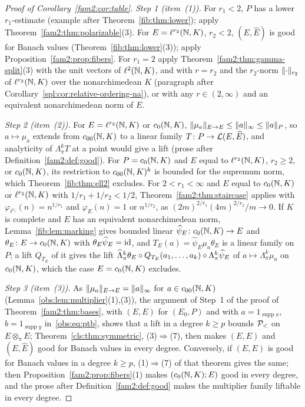 \begin{proof}[Proof of Corollary~\ref{fam2:cor:table}]
\emph{Step 1 (item~(1)).} For $r_1<2$, $P$ has a lower $r_1$-estimate (example after Theorem~\ref{fib:thm:lower}); apply
Theorem~\ref{fam2:thm:polarizable}(3). For $E=\ell^{r_2}(\mathbb N,K)$, $r_2<2$, $(E,\widehat E)$ is good for Banach values
(Theorem~\ref{fib:thm:lower}(3)); apply Proposition~\ref{fam2:prop:fibers}. For $r_1=2$ apply
Theorem~\ref{fam2:thm:gamma-split}(3) with the unit vectors of $\ell^2(\mathbb N,K)$, and with $r=r_2$ and the $r_2$-norm
$\lVert \cdot\rVert_{r_2}$ of $\ell^{r_2}(\mathbb N,K)$ over the nonarchimedean $K$ (paragraph after
Corollary~\ref{spl:cor:relative-ordering-na}), or with any $r\in(2,\infty)$ and an equivalent nonarchimedean norm of $E$.

\emph{Step 2 (item~(2)).} For $E=\ell^{r_2}(\mathbb N,K)$ or $c_0(\mathbb N,K)$, $\lVert \mu_a\rVert_{E\to E}\le\lVert a\rVert_\infty\le\lVert a\rVert_P$,
so $a\mapsto\mu_a$ extends from $c_{00}(\mathbb N,K)$ to a linear family $T\colon P\to\mathcal L(E,\widehat E)$, and analyticity of
$\Lambda^k_\pi T$ at a point would give a lift (prose after Definition~\ref{fam2:def:good}). For $P=c_0(\mathbb N,K)$ and $E$
equal to $\ell^{r_2}(\mathbb N,K)$, $r_2\ge2$, or $c_0(\mathbb N,K)$, its restriction to $c_{00}(\mathbb N,K)^k$ is bounded for the supremum
norm, which Theorem~\ref{fib:thm:ell2} excludes. For $2<r_1<\infty$ and $E$ equal to $c_0(\mathbb N,K)$ or $\ell^{r_2}(\mathbb N,K)$ with
$1/r_1+1/r_2<1/2$, Theorem~\ref{fam2:thm:staircase} applies with $\varphi_{\ell^{r_1}}(n)=n^{1/r_1}$ and $\varphi_E(n)=1$
or $n^{1/r_2}$, as $(2m)^{2/r_1}(4m)^{2/r_2}/m\to0$. If $K$ is complete and $E$ has an equivalent nonarchimedean norm,
Lemma~\ref{fib:lem:marking} gives bounded linear $\widehat\psi_E\colon c_0(\mathbb N,K)\to E$ and $\theta_E\colon E\to c_0(\mathbb N,K)$
with $\theta_E\widehat\psi_E=\mathrm{id}$, and $T_E(a)=\widehat\psi_E\mu_a\theta_E$ is a linear family on $P$; a lift $Q_{T_E}$ of it
gives the lift $\widehat\Lambda^k_\pi\theta_E\circ Q_{T_E}(a_1,\dots,a_k)\circ\Lambda^k_\pi\widehat\psi_E$ of $a\mapsto
\Lambda^k_\pi\mu_a$ on $c_0(\mathbb N,K)$, which the case $E=c_0(\mathbb N,K)$ excludes.

\emph{Step 3 (item~(3)).} As $\lVert \mu_a\rVert_{E\to E}=\lVert a\rVert_\infty$ for $a\in c_{00}(\mathbb N,K)$
(Lemma~\ref{obs:lem:multiplier}(1),(3)), the argument of Step~1 of the proof of Theorem~\ref{fam2:thm:bases}, with $(E,E)$
for $(E_0,P)$ and with $a=1_{\operatorname{supp}x}$, $b=1_{\operatorname{supp}y}$ in~\eqref{obs:eq:ptb}, shows that a lift in
a degree $k\ge p$ bounds $\mathcal P_<$ on $E\otimes_\pi E$; Theorem~\ref{cls:thm:symmetric}, (3)$\Rightarrow$(7), then makes
$(E,E)$ and $(E,\widehat E)$ good for Banach values in every degree. Conversely, if $(E,E)$ is
good for Banach values in a degree $k\ge p$, (1)$\Rightarrow$(7) of that theorem gives the same; then
Proposition~\ref{fam2:prop:fibers}(1) makes $(c_0(\mathbb N,K);E)$ good in every degree, and the prose after
Definition~\ref{fam2:def:good} makes the multiplier family liftable in every degree.
\end{proof}

